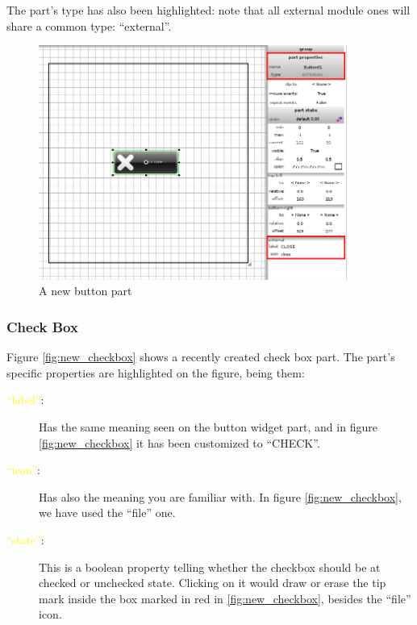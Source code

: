 \documentclass[a4paper]{profusion}
\newcommand{\GUIEditable}[1]{\textcolor{yellow}{#1}} %
\begin{document}
The part's type has also been highlighted: note that all external
module ones will share a common type: ``external''.

\begin{figure}[h!]
  \centering
  \includegraphics[width=0.9\textwidth]{images/new_button.png}
  \caption{A new button part}
  \label{fig:new_button}
\end{figure}

\subsubsection{Check Box}

Figure \ref{fig:new_checkbox} shows a recently created check box
part. The part's specific properties are highlighted on the figure,
being them:

\begin{description}
  \item[\GUIEditable{``label''}:] Has the same meaning seen on the
    button widget part, and in figure \ref{fig:new_checkbox} it has
    been customized to ``CHECK''.
  \item[\GUIEditable{``icon''}:] Has also the meaning you are familiar
    with. In figure \ref{fig:new_checkbox}, we have used the ``file''
    one.
  \item[\GUIEditable{``state''}:] This is a boolean property telling
    whether the checkbox should be at checked or unchecked
    state. Clicking on it would draw or erase the tip mark inside the
    box marked in red in \ref{fig:new_checkbox}, besides the ``file''
    icon.
\end{description}
\end{document}
